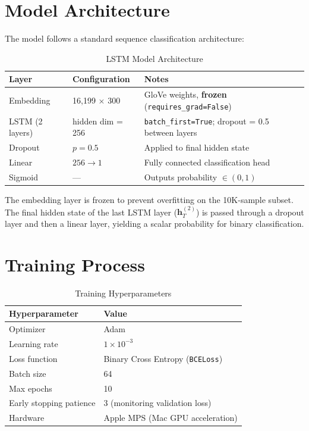 \documentclass[11pt, a4paper]{article}
\begin{document}
\section{Model Architecture}

The model follows a standard sequence classification architecture:

\begin{table}[h]
\centering
\caption{LSTM Model Architecture}
\begin{tabular}{lll}
\toprule
\textbf{Layer} & \textbf{Configuration} & \textbf{Notes} \\
\midrule
Embedding       & 16,199 $\times$ 300 & GloVe weights, \textbf{frozen} (\texttt{requires\_grad=False}) \\
LSTM (2 layers) & hidden dim = 256    & \texttt{batch\_first=True}; dropout = 0.5 between layers \\
Dropout         & $p = 0.5$           & Applied to final hidden state \\
Linear          & $256 \rightarrow 1$ & Fully connected classification head \\
Sigmoid         & ---                 & Outputs probability $\in (0, 1)$ \\
\bottomrule
\end{tabular}
\end{table}

The embedding layer is frozen to prevent overfitting on the 10K-sample subset. The final hidden state of the last LSTM layer ($\mathbf{h}_T^{(2)}$) is passed through a dropout layer and then a linear layer, yielding a scalar probability for binary classification.

\section{Training Process}

\begin{table}[h]
\centering
\caption{Training Hyperparameters}
\begin{tabular}{ll}
\toprule
\textbf{Hyperparameter} & \textbf{Value} \\
\midrule
Optimizer        & Adam \\
Learning rate    & $1 \times 10^{-3}$ \\
Loss function    & Binary Cross Entropy (\texttt{BCELoss}) \\
Batch size       & 64 \\
Max epochs       & 10 \\
Early stopping patience & 3 (monitoring validation loss) \\
Hardware         & Apple MPS (Mac GPU acceleration) \\
\bottomrule
\end{tabular}
\end{table}
\end{document}
